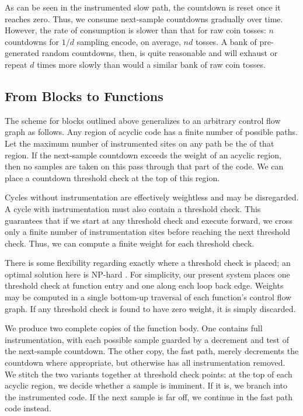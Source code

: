 As can be seen in the instrumented slow path, the countdown is
reset once it reaches zero.  Thus, we consume next-sample countdowns
gradually over time.  However, the rate of consumption is slower than
that for raw coin tosses: $n$ countdowns for $1/d$ sampling encode, on
average, $nd$ tosses.  A bank of pre-generated random countdowns,
then, is quite reasonable and will exhaust or repeat $d$ times more
slowly than would a similar bank of raw coin tosses.

\subsection{From Blocks to Functions}

The scheme for blocks outlined above generalizes to an arbitrary
control flow graph as follows.  Any region of acyclic code has a
finite number of possible paths.  Let the maximum number of
instrumented sites on any path be the  of that region.
If the next-sample countdown exceeds the weight of an acyclic region,
then no samples are taken on this pass through that part of the
code.  We can place a countdown threshold check at the top of this
region.

Cycles without instrumentation are effectively weightless and may be
disregarded.  A cycle with instrumentation must also contain a
threshold check.  This guarantees that if we start at any threshold
check and execute forward, we cross only a finite number of
instrumentation sites before reaching the next threshold check.  Thus,
we can compute a finite weight for each threshold check.

There is some flexibility regarding exactly where a threshold check is
placed; an optimal solution here is NP-hard
\cite{Hirzel:2001:BT-FLOTP}.  For simplicity, our present system
places one threshold check at function entry and one along each loop
back edge.  Weights may be computed in a single bottom-up traversal of
each function's control flow graph.  If any threshold check is found
to have zero weight, it is simply discarded.

We produce two complete copies of the function body.  One contains
full instrumentation, with each possible sample guarded by a decrement
and test of the next-sample countdown.  The other copy, the fast path,
merely decrements the countdown where appropriate, but otherwise has
all instrumentation removed.  We stitch the two variants together at
threshold check points: at the top of each acyclic region, we decide
whether a sample is imminent.  If it is, we branch into the
instrumented code.  If the next sample is far off, we continue in the
fast path code instead.

